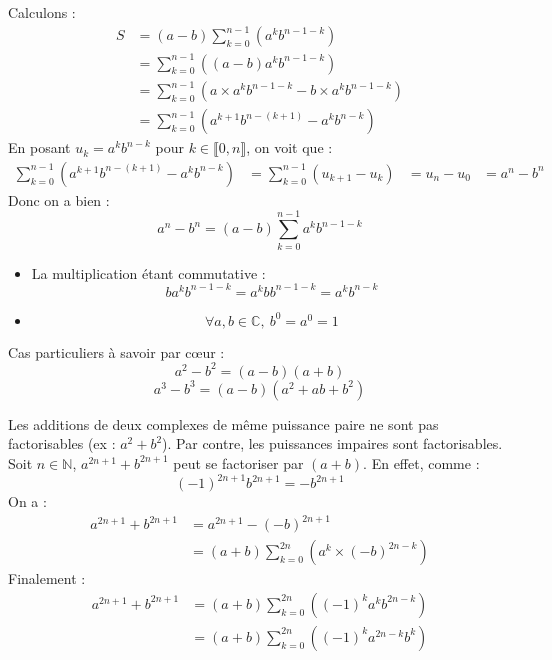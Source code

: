\documentclass[a4paper,11pt]{article}
\newcommand{\N}{\mathbb{N}}
\newcommand{\C}{\mathbb{C}}
\newcommand{\intN}[2]{\llbracket #1, #2 \rrbracket}
\begin{document}
\begin{demonstration}
	Calculons :
	\begin{align*}
		S &= (a-b)\sum_{k=0}^{n-1}(a^kb^{n-1-k})\\
		&= \sum_{k=0}^{n-1}((a-b)a^k b^{n-1-k})\\
		&= \sum_{k=0}^{n-1}(a\times a^k b^{n-1-k} - b\times a^k b^{n-1-k})\\
		&= \sum_{k=0}^{n-1}(a^{k+1}b^{n-(k+1)} - a^k b^{n-k})
	\end{align*}
	En posant $u_k = a^k b^{n-k}$ pour $k\in\intN{0}{n}$, on voit que :
	\begin{align*}
		\sum_{k=0}^{n-1}(a^{k+1} b^{n-(k+1)} - a^k b^{n-k}) &= \sum_{k=0}^{n-1}(u_{k+1} - u_k)
		&= u_n - u_0
		&= a^n - b^n
	\end{align*}
	Donc on a bien :
	$$a^n - b^n = (a-b)\sum_{k=0}^{n-1}a^k b^{n-1-k}$$
\end{demonstration}

\begin{remarque}
	\begin{itemize}
		\item La multiplication étant commutative :
		$$b a^k b^{n-1-k} = a^k b b^{n-1-k} = a^k b^{n-k}$$
		\item $$\forall a,b \in\C, \: b^0 = a^0 = 1$$
	\end{itemize}
\end{remarque}

\begin{proposition}
	Cas particuliers à savoir par cœur :
	$$a^2 - b^2 = (a-b)(a+b)$$
	$$a^3 - b^3 = (a-b)(a^2 + ab + b^2)$$
\end{proposition}

\begin{remarque}
	Les additions de deux complexes de même puissance paire ne sont pas factorisables (ex : $a^2 + b^2$).
	Par contre, les puissances impaires sont factorisables. Soit $n\in\N$, $a^{2n + 1} + b^{2n + 1}$ peut se factoriser par $(a+b)$.
	En effet, comme : 
	$$(-1)^{2n + 1}b^{2n + 1} = -b^{2n + 1}$$
	On a :
	\begin{align*}
		a^{2n + 1} + b^{2n + 1} &= a^{2n + 1} - (-b)^{2n + 1} \\
		&= (a + b)\sum_{k=0}^{2n}(a^k\times (-b)^{2n - k})
	\end{align*}
	Finalement :
	\begin{align*}
		a^{2n + 1} + b^{2n + 1} &= (a+b)\sum_{k=0}^{2n}((-1)^k a^k b^{2n - k}) \\
		&= (a+b)\sum_{k=0}^{2n}((-1)^k a^{2n - k} b^k)
	\end{align*}
\end{remarque}
\end{document}
